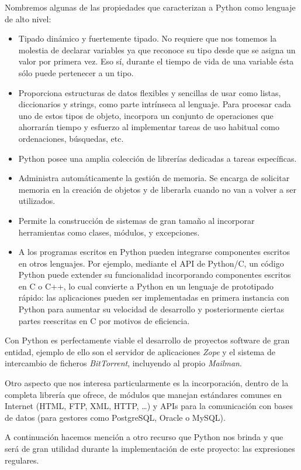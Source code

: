 Nombremos algunas de las propiedades que caracterizan a Python como lenguaje
de alto nivel:
\begin{itemize}
\item Tipado dinámico y fuertemente tipado. No requiere que nos tomemos la
molestia de declarar variables ya que reconoce su tipo desde que se asigna
un valor por primera vez. Eso sí, durante el tiempo de vida de una variable
ésta sólo puede pertenecer a un tipo. 
\item Proporciona estructuras de datos flexibles y sencillas de usar como
listas, diccionarios y strings, como parte intrínseca al lenguaje. Para
procesar cada uno de estos tipos de objeto, incorpora un conjunto de operaciones
que ahorrarán tiempo y esfuerzo al implementar tareas de uso habitual como
ordenaciones, búsquedas, etc.
\item Python posee una amplia colección de librerías dedicadas a tareas
específicas.
\item Administra automáticamente la gestión de memoria. Se encarga de
solicitar memoria en la creación de objetos y de liberarla cuando no van a
volver a ser utilizados.
\item Permite la construcción de sistemas de gran tamaño al incorporar
herramientas como clases, módulos, y excepciones.
\item A los programas escritos en Python pueden integrarse componentes
escritos en otros lenguajes. Por ejemplo, mediante el API de Python/C,
un código Python puede extender su funcionalidad incorporando componentes
escritos en C o C++, lo cual convierte a Python en un lenguaje de prototipado
rápido: las aplicaciones pueden ser implementadas en primera instancia con
Python para aumentar su velocidad de desarrollo y posteriormente ciertas
partes reescritas en C por motivos de eficiencia.
\end{itemize}

Con Python es perfectamente viable el desarrollo de proyectos software de gran
entidad, ejemplo de ello son el servidor de aplicaciones \textit{Zope} y el
sistema de intercambio de ficheros \textit{BitTorrent}, incluyendo al propio
\textit{Mailman}.

Otro aspecto que nos interesa particularmente es la incorporación, dentro de
la completa librería que ofrece, de módulos que manejan estándares comunes
en Internet (HTML, FTP, XML, HTTP, \ldots) y APIs para la comunicación con
bases de datos (para gestores como PostgreSQL, Oracle o MySQL).

A continuación hacemos mención a otro recurso que Python nos brinda y que
será de gran utilidad durante la implementación de este proyecto: las expresiones
regulares.


